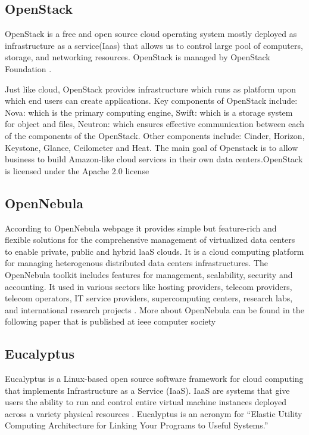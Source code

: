 {\subsection{OpenStack \cv}
 
OpenStack \cite{www-OpenStack.org} is a free and open source cloud
operating system mostly deployed as infrastructure as a service(Iaas)
that allows us to control large pool of computers, storage, and
networking resources.  OpenStack is managed by OpenStack Foundation
\cite{www-OpenStack-Found}.
     
Just like cloud, OpenStack provides infrastructure which runs as
platform upon which end users can create applications. Key components
of OpenStack include: Nova: which is the primary computing engine,
Swift: which is a storage system for object and files, Neutron: which
ensures effective communication between each of the components of the
OpenStack. Other components include: Cinder, Horizon, Keystone,
Glance, Ceilometer and Heat. The main goal of Openstack is to allow
business to build Amazon-like cloud services in their own data
centers.OpenStack is licensed under the Apache 2.0 license
\cite{www-apache-license}
	
\subsection{OpenNebula \cv}

     According to OpenNebula webpage \cite{www-opennebula-org} it
     provides simple but feature-rich and flexible solutions for the
     comprehensive management of virtualized data centers to enable
     private, public and hybrid laaS clouds. It is a cloud computing
     platform for managing heterogenous distributed data centers
     infrastructures. The OpenNebula toolkit includes features for
     management, scalability, security and accounting. It used in
     various sectors like hosting providers, telecom providers,
     telecom operators, IT service providers, supercomputing centers,
     research labs, and international research projects
     \cite{www-opennebula-wiki}. More about OpenNebula can be found
     in the following paper that is published at ieee computer society
     \cite{paper-opennebula}
     
\subsection{Eucalyptus}

     Eucalyptus is a Linux-based open source software framework for
     cloud computing that implements Infrastructure as a Service
     (IaaS). IaaS are systems that give users the ability to run and
     control entire virtual machine instances deployed across a
     variety physical resources \cite{paper-eucalyptus}. Eucalyptus
     is an acronym for ``Elastic Utility Computing Architecture for
     Linking Your Programs to Useful Systems.''

}
